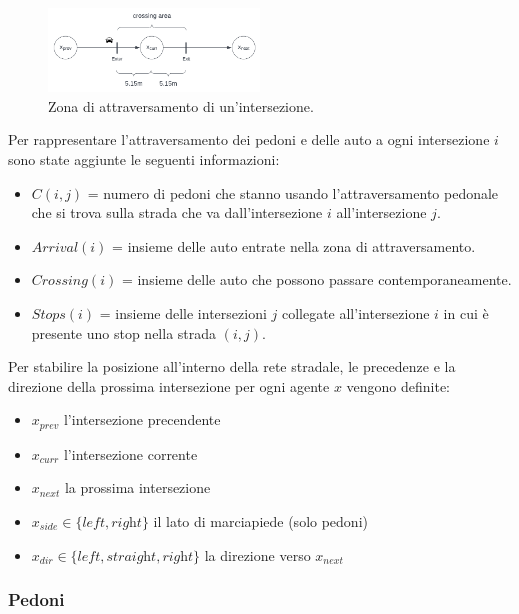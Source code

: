 \begin{figure}[ht]
    \centering
    \includegraphics[width=0.5\textwidth]{images/crossing_area}
    \caption{Zona di attraversamento di un'intersezione.}
    \label{fig:crossing-area}
\end{figure}

Per rappresentare l'attraversamento dei pedoni e delle auto a ogni intersezione $i$ sono state aggiunte le seguenti informazioni:
\begin{itemize}
    \item $C(i, j)$ = numero di pedoni che stanno usando l'attraversamento pedonale che si trova sulla strada che va dall'intersezione $i$ all'intersezione $j$.
    \item $\textit{Arrival}(i)$ = insieme delle auto entrate nella zona di attraversamento.
    \item $\textit{Crossing}(i)$ = insieme delle auto che possono passare contemporaneamente.
    \item $\textit{Stops}(i)$ = insieme delle intersezioni $j$ collegate all'intersezione $i$ in cui è presente uno stop nella strada $(i, j)$.
\end{itemize}


Per stabilire la posizione all'interno della rete stradale, le precedenze e la direzione della prossima intersezione per ogni agente $x$
vengono definite:
\begin{itemize}
    \item $x_{prev}$ l'intersezione precendente
    \item $x_{curr}$ l'intersezione corrente
    \item $x_{next}$ la prossima intersezione
    \item $x_{side} \in \{ \textit{left}, \textit{right} \}$  il lato di marciapiede (solo pedoni)
    \item $x_{dir} \in \{\textit{left}, \textit{straight}, \textit{right}\}$ la direzione verso $x_{next}$
\end{itemize}

\subsubsection{Pedoni}

